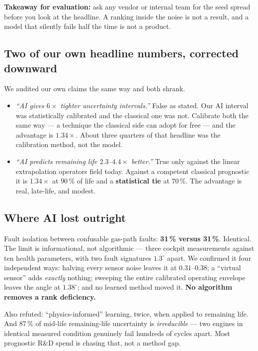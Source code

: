 \documentclass[11pt]{article}
\begin{document}
\textbf{Takeaway for evaluation:} ask any vendor or internal team for the seed
spread before you look at the headline. A ranking inside the noise is not a
result, and a model that silently fails half the time is not a product.

\subsection{Two of our own headline numbers, corrected downward}
We audited our own claims the same way and both shrank.

\begin{itemize}
  \item \emph{``AI gives $6\times$ tighter uncertainty intervals.''} False as
        stated. Our AI interval was statistically calibrated and the classical
        one was not. Calibrate both the same way --- a technique the classical
        side can adopt for free --- and the advantage is $\mathbf{1.34\times}$.
        About three quarters of that headline was the calibration method, not
        the model.
  \item \emph{``AI predicts remaining life $2.3$--$4.4\times$ better.''} True
        only against the linear extrapolation operators field today. Against a
        competent classical prognostic it is $\mathbf{1.34\times}$ at $90\,\%$ of
        life and a \textbf{statistical tie} at $70\,\%$. The advantage is real,
        late-life, and modest.
\end{itemize}

\subsection{Where AI lost outright}
Fault isolation between confusable gas-path faults: \textbf{31\,\% versus
31\,\%}. Identical. The limit is informational, not algorithmic --- three cockpit
measurements against ten health parameters, with two fault signatures
$1.3^{\circ}$ apart. We confirmed it four independent ways: halving every sensor
noise leaves it at $0.31$--$0.38$; a ``virtual sensor'' adds \emph{exactly}
nothing; sweeping the entire calibrated operating envelope leaves the angle at
$1.38^{\circ}$; and no learned method moved it. \textbf{No algorithm removes a
rank deficiency.}

Also refuted: ``physics-informed'' learning, twice, when applied to remaining
life. And $87\,\%$ of mid-life remaining-life uncertainty is \emph{irreducible} ---
two engines in identical measured condition genuinely fail hundreds of cycles
apart. Most prognostic R\&D spend is chasing that, not a method gap.
\end{document}
